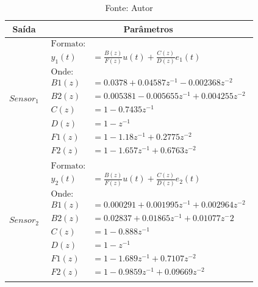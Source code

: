 \begin{table}[h]
	\centering
	\caption{Melhor modelo experimental - BJ}
	\label{tab:tclabsp-model-bj}
	\begin{tabular}{c|c} \toprule
		{Saída}			&	{Parâmetros}									\\ \midrule
		$Sensor_1$			&
								$ 
									\begin{aligned}
										\text{Formato:}														\\
										y_1(t) &= \frac{B(z)}{F(z)}u(t) + \frac{C(z)}{D(z)}e_1(t)			\\
										\text{Onde:}														\\
										B1(z) &= 0.0378 + 0.04587 z^{-1} - 0.002368 z^{-2}          		\\
										B2(z) &= 0.005381 - 0.005655 z^{-1} + 0.004255 z^{-2}    			\\		  
										C(z) &= 1 - 0.7435 z^{-1}                           				\\  
										D(z) &= 1 - z^{-1}                               					\\
										F1(z) &= 1 - 1.18 z^{-1} + 0.2775 z^{-2}         					\\
										F2(z) &= 1 - 1.657 z^{-1} + 0.6763 z^{-2}  
									\end{aligned}
								$	
							\\ \midrule
		$Sensor_2$			&
								$ 
									\begin{aligned}
										\text{Formato:}														\\
										y_2(t) &= \frac{B(z)}{F(z)}u(t) + \frac{C(z)}{D(z)}e_2(t)			\\
										\text{Onde:}														\\
										B1(z) &= 0.000291 + 0.001995 z^{-1} + 0.002964 z^{-2}        		\\
										B2(z) &= 0.02837 + 0.01865 z^{-1} + 0.01077 z^-2          			\\
										C(z) &= 1 - 0.888 z^{-1}                                 			\\
										D(z) &= 1 - z^{-1}                                     				\\
										F1(z) &= 1 - 1.689 z^{-1} + 0.7107 z^{-2}              				\\
										F2(z) &= 1 - 0.9859 z^{-1} + 0.09669 z^{-2}    			
									\end{aligned}
								$
							\\ \bottomrule
	\end{tabular}
	\caption*{Fonte: Autor}
\end{table}

